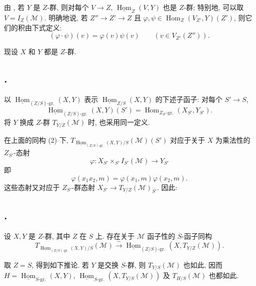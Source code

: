 由 , 若 \(Y\) 是 \(Z\)-群,
则对每个 \(V\to Z\), \(\underline{\operatorname{Hom}}_Z(V,Y)\) 也是 \(Z\)-群;
特别地, 可以取 \(V=I_Z(\mathcal M)\). 明确地说, 若 \(Z''\to Z'\to Z\)
且 \(\varphi,\psi\in\operatorname{Hom}_Z(V_{Z'},Y)(Z')\), 则它们的积由下式定义:
\[
  (\varphi\cdot\psi)(v)=\varphi(v)\psi(v)
  \qquad (v\in V_{Z'}(Z'')).
\]

现设 \(X\) 和 \(Y\) 都是 \(Z\)-群.

\subsection*{.}
以 \(\underline{\operatorname{Hom}}_{(Z/S)\text{-gr.}}(X,Y)\) 表示
\(\underline{\operatorname{Hom}}_{Z/S}(X,Y)\) 的下述子函子:
对每个 \(S'\to S\),
\begin{equation}
 \underline{\operatorname{Hom}}_{(Z/S)\text{-gr.}}(X,Y)(S')
 =\operatorname{Hom}_{Z_{S'}\text{-gr.}}(X_{S'},Y_{S'}).
 \tag{3}\label{sga3:ii:subsection:4-2-0:equation:3}
\end{equation}
将 \(Y\) 换成 \(Z\)-群 \(T_{Y/Z}(\mathcal M)\) 时, 也采用同一定义.

在上面的同构 (2) 下,
\(T_{\underline{\operatorname{Hom}}_{(Z/S)\text{-gr.}}(X,Y)/S}
(\mathcal M)(S')\) 对应于关于 \(X\) 为乘法性的 \(Z_{S'}\)-态射
\[
 \varphi:X_{S'}\times_{S'}I_{S'}(\mathcal M)\longrightarrow Y_{S'}
\]
即
\[
 \varphi(x_1x_2,m)=\varphi(x_1,m)\varphi(x_2,m).
\]
这些态射又对应于 \(Z_{S'}\)-群态射
\(X_{S'}\to T_{Y/Z}(\mathcal M)_{S'}\). 因此:

\subsection*{.}
设 \(X,Y\) 是 \(Z\)-群, 其中 \(Z\) 在 \(S\) 上.
存在关于 \(\mathcal M\) 函子性的 \(S\)-函子同构
\[
 T_{\underline{\operatorname{Hom}}_{(Z/S)\text{-gr.}}(X,Y)/S}
   (\mathcal M)
 \xrightarrow{\sim}
 \underline{\operatorname{Hom}}_{(Z/S)\text{-gr.}}
   (X,T_{Y/Z}(\mathcal M)).
\]

取 \(Z=S\), 得到如下推论. 若 \(Y\) 是交换 \(S\)-群,
则 \(T_{Y/S}(\mathcal M)\) 也如此, 因而
\(H=\underline{\operatorname{Hom}}_{S\text{-gr.}}(X,Y)\),
\(\underline{\operatorname{Hom}}_{S\text{-gr.}}
(X,T_{Y/S}(\mathcal M))\) 及 \(T_{H/S}(\mathcal M)\) 也都如此.

